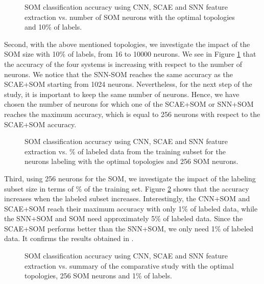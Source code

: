 \documentclass[runningheads]{llncs}
\begin{document}
\begin{figure}[h!]
	\centerline{}
	\caption{SOM classification accuracy using CNN, SCAE and SNN feature extraction vs. number of SOM neurons with the optimal topologies and 10\% of labels.}
	\label{fig_deepsom-neurons}
\end{figure}

Second, with the above mentioned topologies, we investigate the impact of the SOM size with 10\% of labels, from 16 to 10000 neurons. We see in Figure \ref{fig_deepsom-neurons} that the accuracy of the four systems is increasing with respect to the number of neurons. We notice that the SNN-SOM reaches the same accuracy as the SCAE+SOM starting from 1024 neurons. Nevertheless, for the next step of the study, it is important to keep the same number of neurons. Hence, we have chosen the number of neurons for which one of the SCAE+SOM or SNN+SOM reaches the maximum accuracy, which is equal to 256 neurons with respect to the SCAE+SOM accuracy.

\begin{figure}[h!]
	\centerline{}
	\caption{SOM classification accuracy using CNN, SCAE and SNN feature extraction vs. \% of labeled data from the training subset for the neurons labeling with the optimal topologies and 256 SOM neurons.}
	\label{fig_deepsom-labels}
\end{figure}

Third, using 256 neurons for the SOM, we investigate the impact of the labeling subset size in terms of \% of the training set. Figure \ref{fig_deepsom-labels} shows that the accuracy increases when the labeled subset increases. Interestingly, the CNN+SOM and SCAE+SOM reach their maximum accuracy with only 1\% of labeled data, while the SNN+SOM and SOM need approximately 5\% of labeled data. Since the SCAE+SOM performs better than the SNN+SOM, we only need 1\% of labeled data. It confirms the results obtained in \cite{khacef2019self-organizing_neurons}.

\begin{figure}[h!]
	\centerline{}
	\caption{SOM classification accuracy using CNN, SCAE and SNN feature extraction vs. summary of the comparative study with the optimal topologies, 256 SOM neurons and 1\% of labels.}
	\label{fig_deepsom-accuracy}
\end{figure}
\end{document}
